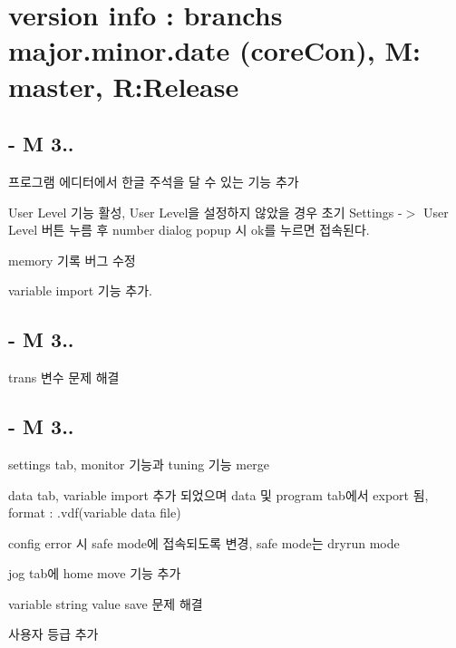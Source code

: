 \section*{version info \-: branchs major.\-minor.\-date (core\-Con), M\-: master, R\-:Release}

\par


\subsection*{-\/ M 3..}


\begin{DoxyEnumerate}
\item 프로그램 에디터에서 한글 주석을 달 수 있는 기능 추가
\item User Level 기능 활성, User Level을 설정하지 않았을 경우 초기 Settings -\/$>$ User Level 버튼 누름 후 number dialog popup 시 ok를 누르면 접속된다.
\item memory 기록 버그 수정
\item variable import 기능 추가.
\end{DoxyEnumerate}

\subsection*{-\/ M 3..}


\begin{DoxyEnumerate}
\item trans 변수 문제 해결
\end{DoxyEnumerate}

\subsection*{-\/ M 3..}


\begin{DoxyEnumerate}
\item settings tab, monitor 기능과 tuning 기능 merge
\item data tab, variable import 추가 되었으며 data 및 program tab에서 export 됨, format \-: .vdf(variable data file)
\item config error 시 safe mode에 접속되도록 변경, safe mode는 dryrun mode
\item jog tab에 home move 기능 추가
\item variable string value save 문제 해결
\item 사용자 등급 추가
\end{DoxyEnumerate}


